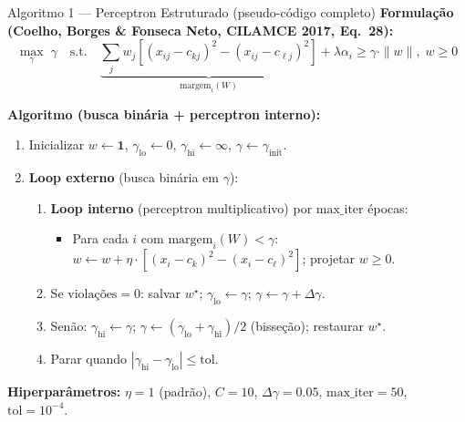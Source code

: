 \documentclass[aspectratio=169,10pt]{beamer}
\begin{document}
\begin{frame}{Algoritmo 1 --- Perceptron Estruturado (pseudo-c\'odigo completo)}
  \scriptsize
  \textbf{Formula\c{c}\~ao (Coelho, Borges \& Fonseca Neto, CILAMCE 2017, Eq.~28):}
  \[
    \max_{\gamma}\; \gamma \quad\text{s.t.}\quad
    \underbrace{\sum_j w_j [(x_{ij}-c_{kj})^2 - (x_{ij}-c_{\ell j})^2]}_{\text{margem}_i(W)} + \lambda \alpha_i \geq \gamma \cdot \|w\|,\; w \geq 0
  \]

  \textbf{Algoritmo (busca bin\'aria + perceptron interno):}
  \begin{enumerate}
    \item Inicializar $w \leftarrow \mathbf{1}$, $\gamma_{\text{lo}} \leftarrow 0$, $\gamma_{\text{hi}} \leftarrow \infty$, $\gamma \leftarrow \gamma_{\text{init}}$.
    \item \textbf{Loop externo} (busca bin\'aria em $\gamma$):
      \begin{enumerate}
        \item \textbf{Loop interno} (perceptron multiplicativo) por $\text{max\_iter}$ \'epocas:
        \begin{itemize}
          \item Para cada $i$ com $\text{margem}_i(W) < \gamma$: $w \leftarrow w + \eta \cdot [(x_i - c_k)^2 - (x_i - c_\ell)^2]$; projetar $w \geq 0$.
        \end{itemize}
        \item Se $\text{viola\c{c}\~oes} = 0$: salvar $w^\star$; $\gamma_{\text{lo}} \leftarrow \gamma$; $\gamma \leftarrow \gamma + \Delta\gamma$.
        \item Sen\~ao: $\gamma_{\text{hi}} \leftarrow \gamma$; $\gamma \leftarrow (\gamma_{\text{lo}} + \gamma_{\text{hi}})/2$ (bisse\c{c}\~ao); restaurar $w^\star$.
        \item Parar quando $|\gamma_{\text{hi}} - \gamma_{\text{lo}}| \leq \text{tol}$.
      \end{enumerate}
  \end{enumerate}

  \textbf{Hiperpar\^ametros:} $\eta = 1$ (padr\~ao), $C = 10$, $\Delta\gamma = 0.05$, $\text{max\_iter} = 50$, $\text{tol} = 10^{-4}$.
\end{frame}
\end{document}
